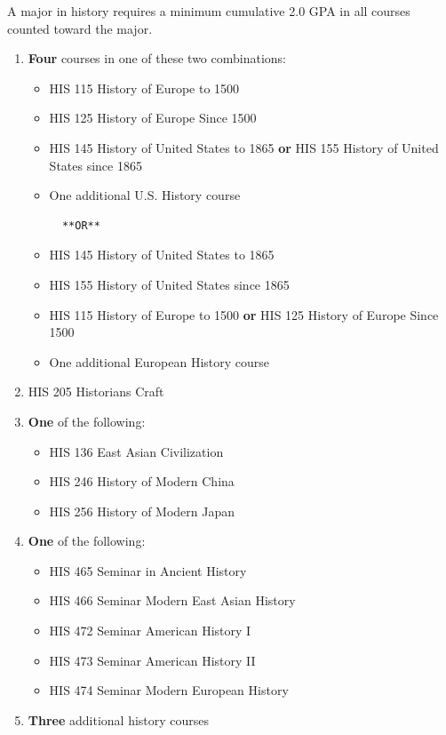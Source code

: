 \documentclass[
  letterpaper,
]{scrbook}
\providecommand{\tightlist}{%
  \setlength{\itemsep}{0pt}\setlength{\parskip}{0pt}}
\begin{document}
A major in history requires a minimum cumulative 2.0 GPA in all courses
counted toward the major.

\begin{enumerate}
\def\labelenumi{\arabic{enumi}.}
\tightlist
\item
  \textbf{Four} courses in one of these two combinations:

  \begin{itemize}
  \item
    HIS 115 History of Europe to 1500
  \item
    HIS 125 History of Europe Since 1500
  \item
    HIS 145 History of United States to 1865 \textbf{or} HIS 155 History
    of United States since 1865
  \item
    One additional U.S. History course

\begin{verbatim}
  **OR**
\end{verbatim}
  \item
    HIS 145 History of United States to 1865
  \item
    HIS 155 History of United States since 1865
  \item
    HIS 115 History of Europe to 1500 \textbf{or} HIS 125 History of
    Europe Since 1500
  \item
    One additional European History course
  \end{itemize}
\item
  HIS 205 Historians Craft
\item
  \textbf{One} of the following:

  \begin{itemize}
  \tightlist
  \item
    HIS 136 East Asian Civilization
  \item
    HIS 246 History of Modern China
  \item
    HIS 256 History of Modern Japan
  \end{itemize}
\item
  \textbf{One} of the following:

  \begin{itemize}
  \tightlist
  \item
    HIS 465 Seminar in Ancient History
  \item
    HIS 466 Seminar Modern East Asian History
  \item
    HIS 472 Seminar American History I
  \item
    HIS 473 Seminar American History II
  \item
    HIS 474 Seminar Modern European History
  \end{itemize}
\item
  \textbf{Three} additional history courses
\end{enumerate}
\end{document}
